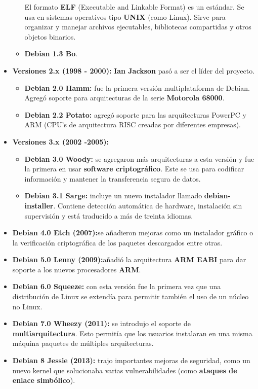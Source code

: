 \documentclass[a4paper, 12pt]{book}
\begin{document}
\begin{itemize}
\begin{itemize}
		El formato \textbf{ELF} (Executable and Linkable Format) es un estándar. Se usa en sistemas operativos tipo \textbf{UNIX} (como Linux). Sirve para organizar y manejar archivos ejecutables, bibliotecas compartidas y otros objetos binarios.
		\item \textbf {Debian 1.3 Bo}.
	\end{itemize}
	\item \textbf {Versiones 2.x (1998 - 2000):} \textbf{Ian Jackson} pasó a ser el líder del proyecto.
	\begin{itemize}
		\item \textbf {Debian 2.0 Hamm: }fue la primera versión multiplataforma de Debian. Agregó soporte para arquitecturas de la serie \textbf{Motorola 68000}.
		\item \textbf {Debian 2.2 Potato: }agregó soporte para las arquitecturas  PowerPC y ARM (CPU's de arquitectura RISC creadas por diferentes empresas).
	\end{itemize}
	\item \textbf {Versiones 3.x (2002 -2005):}
	\begin{itemize}
		\item \textbf {Debian 3.0 Woody: }se agregaron más arquitecturas a esta versión y fue la primera en usar \textbf {software criptográfico}. Este se usa para codificar información y mantener la transferencia segura de datos.
		\item \textbf {Debian 3.1 Sarge: }incluye un nuevo instalador llamado \textbf {debian-installer}. Contiene detección automática de hardware, instalación sin supervisión y está traducido a más de treinta idiomas.
	\end{itemize}
	\item \textbf {Debian 4.0 Etch (2007):}se añadieron mejoras como un instalador gráfico o la verificación criptográfica de los paquetes descargados entre otras.
	\item \textbf {Debian 5.0 Lenny (2009):}añadió la arquitectura \textbf {ARM EABI} para dar soporte a los nuevos procesadores \textbf {ARM}.
	\item \textbf {Debian 6.0 Squeeze: }con esta versión fue la primera vez que una distribución de Linux se extendía para permitir también el uso de un núcleo no Linux.
	\item \textbf {Debian 7.0 Wheezy (2011):} se introdujo el soporte de \textbf {multiarquitectura}. Esto permitía que los usuarios instalaran en una misma máquina paquetes de múltiples arquitecturas.
	\item \textbf {Debian 8 Jessie (2013):} trajo importantes mejoras de seguridad, como un nuevo kernel que solucionaba varias vulnerabilidades (como \textbf {ataques de enlace simbólico}).

\end{itemize}
\end{document}
